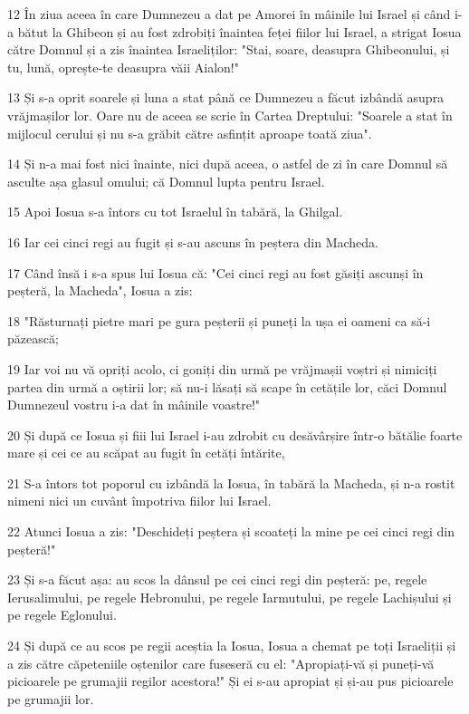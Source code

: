 \par 12 În ziua aceea în care Dumnezeu a dat pe Amorei în mâinile lui Israel și când i-a bătut la Ghibeon și au fost zdrobiți înaintea feței fiilor lui Israel, a strigat Iosua către Domnul și a zis înaintea Israeliților: "Stai, soare, deasupra Ghibeonului, și tu, lună, oprește-te deasupra văii Aialon!"
\par 13 Și s-a oprit soarele și luna a stat până ce Dumnezeu a făcut izbândă asupra vrăjmașilor lor. Oare nu de aceea se scrie în Cartea Dreptului: "Soarele a stat în mijlocul cerului și nu s-a grăbit către asfințit aproape toată ziua".
\par 14 Și n-a mai fost nici înainte, nici după aceea, o astfel de zi în care Domnul să asculte așa glasul omului; că Domnul lupta pentru Israel.
\par 15 Apoi Iosua s-a întors cu tot Israelul în tabără, la Ghilgal.
\par 16 Iar cei cinci regi au fugit și s-au ascuns în peștera din Macheda.
\par 17 Când însă i s-a spus lui Iosua că: "Cei cinci regi au fost găsiți ascunși în peșteră, la Macheda", Iosua a zis:
\par 18 "Răsturnați pietre mari pe gura peșterii și puneți la ușa ei oameni ca să-i păzească;
\par 19 Iar voi nu vă opriți acolo, ci goniți din urmă pe vrăjmașii voștri și nimiciți partea din urmă a oștirii lor; să nu-i lăsați să scape în cetățile lor, căci Domnul Dumnezeul vostru i-a dat în mâinile voastre!"
\par 20 Și după ce Iosua și fiii lui Israel i-au zdrobit cu desăvârșire într-o bătălie foarte mare și cei ce au scăpat au fugit în cetăți întărite,
\par 21 S-a întors tot poporul cu izbândă la Iosua, în tabără la Macheda, și n-a rostit nimeni nici un cuvânt împotriva fiilor lui Israel.
\par 22 Atunci Iosua a zis: "Deschideți peștera și scoateți la mine pe cei cinci regi din peșteră!"
\par 23 Și s-a făcut așa: au scos la dânsul pe cei cinci regi din peșteră: pe, regele Ierusalimului, pe regele Hebronului, pe regele Iarmutului, pe regele Lachișului și pe regele Eglonului.
\par 24 Și după ce au scos pe regii aceștia la Iosua, Iosua a chemat pe toți Israeliții și a zis către căpeteniile oștenilor care fuseseră cu el: "Apropiați-vă și puneți-vă picioarele pe grumajii regilor acestora!" Și ei s-au apropiat și și-au pus picioarele pe grumajii lor.
